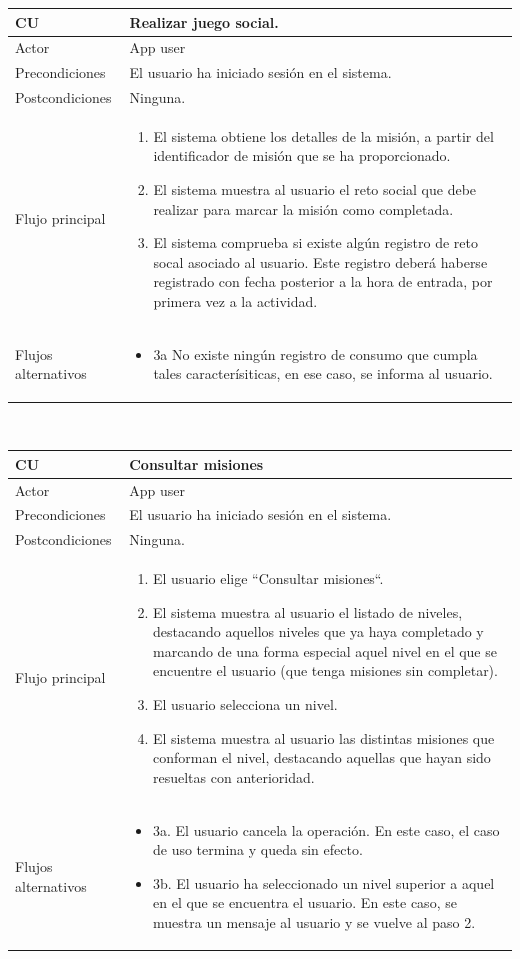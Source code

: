 \documentclass[twoside]{report}
\newcommand\addrow[2]{#1 &#2\\ }
\newcommand\addheading[2]{#1 &#2\\ \hline}
\newcommand\tabularhead{\begin{tabular}{lp{0.7\textwidth}}
\hline
}
\newenvironment{usecase}{\tabularhead}
{\hline\end{tabular}}
\begin{document}
\begin{usecase}
  \addheading{\textbf{CU\arabic{usecase}}}{Realizar juego social.} 
  \addrow{Actor}{App user}
  \addrow{Precondiciones}{El usuario ha iniciado sesión en el sistema.}
  \addrow{Postcondiciones}{Ninguna.}
  \addrow{Flujo principal}{
  		\begin{enumerate}
  		\item El sistema obtiene los detalles de la misión, a partir del identificador de misión que se ha proporcionado.
  		\item El sistema muestra al usuario el reto social que debe realizar para marcar la misión como completada.
  		\item El sistema comprueba si existe algún registro de reto socal asociado al usuario. Este registro deberá haberse registrado con fecha posterior a la hora de entrada, por primera vez a la actividad.
  		\end{enumerate}
  }
  \addrow{Flujos alternativos}{
  		\begin{itemize}
  		\item 3a No existe ningún registro de consumo que cumpla tales caracterísiticas, en ese caso, se informa al usuario.
  		\end{itemize}
  }
\end{usecase}\\

\begin{usecase}
  \addheading{\textbf{CU\arabic{usecase}}}{Consultar misiones} 
  \addrow{Actor}{App user}
  \addrow{Precondiciones}{El usuario ha iniciado sesión en el sistema.}
  \addrow{Postcondiciones}{Ninguna.}
  \addrow{Flujo principal}{
  		\begin{enumerate}
  		\item El usuario elige “Consultar misiones“. %
  		\item El sistema muestra al usuario el listado de niveles, destacando aquellos niveles que ya haya completado y marcando de una forma especial aquel nivel en el que se encuentre el usuario (que tenga misiones sin completar). %
  		\item El usuario selecciona un nivel. %
  		\item El sistema muestra al usuario las distintas misiones que conforman el nivel, destacando aquellas que hayan sido resueltas con anterioridad. %
  		\end{enumerate}
  }
  \addrow{Flujos alternativos}{
  		\begin{itemize}
  		\item 3a. El usuario cancela la operación. En este caso, el caso de uso termina y queda sin efecto.
  		\item 3b. El usuario ha seleccionado un nivel superior a aquel en el que se encuentra el usuario. En este caso, se muestra un mensaje al usuario y se vuelve al paso 2.
  		\end{itemize}
  }
\end{usecase}\\
\end{document}
